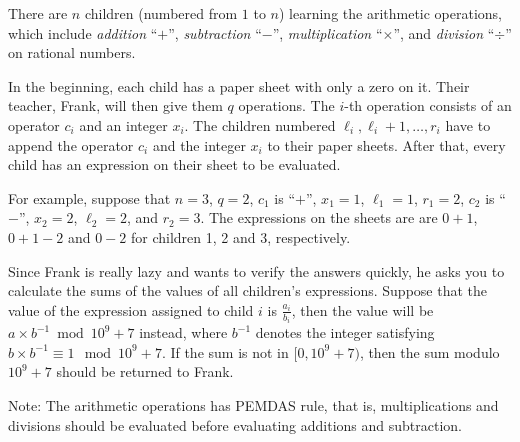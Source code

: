 There are $n$ children (numbered from $1$ to $n$) learning
the arithmetic operations, which include \emph{addition} ``$+$'', 
\emph{subtraction} ``$-$'', 
\emph{multiplication} ``$\times$'', and \emph{division} ``$\div$'' on 
rational numbers.

In the beginning, each child has a paper sheet with only a zero on it. 
Their teacher, Frank, will then give them $q$ operations. 
The $i$-th operation consists of an operator $c_i$ and an integer $x_i$.
The children numbered $\ell_i,\ell_i+1,\dots,r_i$ have to append the 
operator $c_i$ and the integer $x_i$ to their paper sheets.
After that, every child has an expression on their sheet to be evaluated.

For example, suppose that $n=3$, $q=2$, $c_1$ is ``$+$'', $x_1=1$, $\ell_1=1$, 
$r_1=2$, $c_2$ is ``$-$'',  $x_2=2$, $\ell_2=2$, and $r_2=3$. 
The expressions on the sheets are are $0+1$, $0+1-2$ and $0-2$ for 
children 1, 2 and 3, respectively.

Since Frank is really lazy and wants to verify the answers quickly,
he asks you to calculate the sums of the values of all children's 
expressions. 
Suppose that the value of the expression assigned to child $i$ is 
$\frac{a_i}{b_i}$, 
then the value will be $a\times b^{-1}\bmod 10^9+7$ instead, 
where $b^{-1}$ denotes the integer satisfying 
$b\times b^{-1}\equiv 1\mod 10^9+7$. 
If the sum is not in $[0, 10^9+7)$, then the sum modulo $10^9+7$ should be
returned to Frank.

Note: The arithmetic operations has PEMDAS rule, that is, 
multiplications and divisions should be evaluated before evaluating additions
and subtraction.
